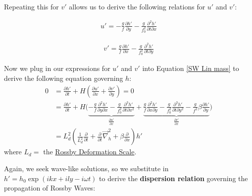 Repeating this for $v'$ allows us to derive the following relations for $u'$ and $v'$:

\begin{minipage}{.48\linewidth}
    \begin{align*}
        u'=-\frac{g}{f}\frac{\partial h'}{\partial y}-\frac{g}{f_0^2}\frac{\partial^2 h'}{\partial t \partial x}
    \end{align*}
\end{minipage}
\hfill
\begin{minipage}{0.48\linewidth}
    \begin{align*}
        v'=\frac{g}{f}\frac{\partial h'}{\partial x}-\frac{g}{f_0^2}\frac{\partial^2 h'}{\partial t \partial y}
    \end{align*}
\end{minipage}

Now we plug in our expressions for $u'$ and $v'$ into Equation \ref{SW Lin mass} to derive the following equation governing $h$:
\begin{align*}
    0&=\frac{\partial h'}{\partial t}+H\left( \frac{\partial u'}{\partial x}+\frac{\partial v'}{\partial y} \right)=0
    \\
    &= \frac{\partial h'}{\partial t}+H\biggl( 
        \underbrace{-\frac{g}{f}\frac{\partial^2 h'}{\partial y \partial x}-\frac{g}{f_0^2}\frac{\partial^3 h'}{\partial t \partial x^2}}_{\frac{\partial u'}{\partial x}}
        +
        \underbrace{\frac{g}{f}\frac{\partial^2 h'}{\partial x\partial y}-\frac{g}{f_0^2}\frac{\partial^3 h'}{\partial t \partial y^2}
        -\frac{g}{f^2}\beta \frac{\partial h'}{\partial y}}_{\frac{\partial v'}{\partial x}}
     \biggr)
    \\
    &=L_d^2\left( \frac{1}{L_d^2}\frac{\partial}{\partial t} + \frac{\partial}{\partial t}\vec{\nabla}_h^2 + \beta \frac{\partial}{\partial x}\right)h'
\end{align*}
where $L_d=$ the \hyperref[SW Def Radius Box]{Rossby Deformation Scale}.

Again, we seek wave-like solutions, so we substitute in $h'=h_0 \exp\left( ikx+ily-i\omega t \right)$ to derive the \textbf{dispersion relation} governing the propagation of Rossby Waves:

